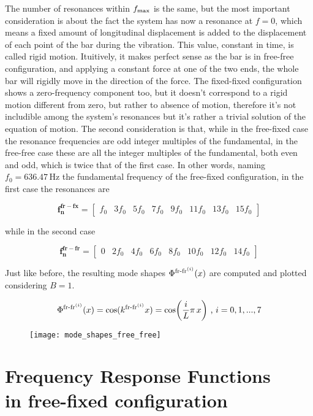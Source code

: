 \documentclass[a4paper,12pt,oneside]{article}
\begin{document}
The number of resonances within $ f_\textup{max} $ is the same, but the most important consideration is about the fact the system has now a resonance at $ f = 0 $, which means a fixed amount of longitudinal displacement is added to the displacement of each point of the bar during the vibration. This value, constant in time, is called rigid motion. Ituitively, it makes perfect sense as the bar is in free-free configuration, and applying a constant force at one of the two ends, the whole bar will rigidly move in the direction of the force. The fixed-fixed configuration shows a zero-frequency component too, but it doesn't correspond to a rigid motion different from zero, but rather to absence of motion, therefore it's not includible among the system's resonances but it's rather a trivial solution of the equation of motion. The second consideration is that, while in the free-fixed case the resonance frequencies are odd integer multiples of the fundamental, in the free-free case these are all the integer multiples of the fundamental, both even and odd, which is twice that of the first case. In other words, naming $ f_0 = 636.47 \, \text{Hz} $ the fundamental frequency of the free-fixed configuration, in the first case the resonances are

\[
	\mathbf{f_n^{fr-fx}} =	\begin{bmatrix}
														f_0	& 3f_0	& 5f_0	& 7f_0	& 9f_0	& 11f_0	& 13f_0	& 15f_0
													\end{bmatrix}
\]

while in the second case

\[
	\mathbf{f_n^{fr-fr}} =	\begin{bmatrix}
														0	& 2f_0	& 4f_0	& 6f_0	& 8f_0	& 10f_0	& 12f_0	& 14f_0
													\end{bmatrix}
\]

Just like before, the resulting mode shapes $ \Phi^{\textup{fr-fr}^{(i)}}(x) $ are computed and plotted considering $ B = 1 $.

\[
	\Phi^{\textup{fr-fr}^{(i)}}(x) = \cos(k^{\textup{fr-fr}^{(i)}} x) = %
		\cos\biggl(\frac{i}{L} \pi \, x\biggr) ~ \text{,} ~ i = 0,1,...,7
\]

\begin{figure}[h]
	\hspace{-70pt}
	\texttt{[image: mode\_shapes\_free\_free]}
\end{figure}


\section{Frequency Response Functions \\ in free-fixed configuration}
\label{sec:frfs}
\end{document}
